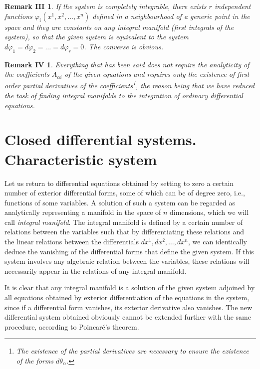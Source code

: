 \begin{rmk40}
\newtheorem*{rmkiii}{\hspace{15pt}Remark III}

\begin{rmkiii}
  If the system is completely integrable, there exists $r$ independent functions $\varphi_{i}(x^{1},x^{2},\dots,x^{n})$ defined in a neighbourhood of a generic point in the space and they are constants on any integral manifold (\emph{first integrals} of the system), so that the given system is equivalent to the system $d\varphi_{1}=d\varphi_{2}=\dots=d\varphi_{r}=0$. The converse is obvious.
\end{rmkiii}
\end{rmk40}

\newtheorem*{rmkiv}{\hspace{15pt}Remark IV}
\begin{rmkiv}
  Everything that has been said does not require the analyticity of the coefficients $A_{\alpha i}$ of the given equations and requires only the existence of first order partial derivatives of the coefficients\footnote{The existence of the partial derivatives are necessary  to ensure the existence of the forms $d\theta_{\alpha}$.}, the reason being that we have reduced the task of finding  integral manifolds to the integration of ordinary differential equations.
\end{rmkiv}

\section{Closed differential systems. Characteristic system}
\label{sec:clos-diff-syst}

\fsec Let us return to differential equations obtained by setting to zero a certain number of exterior differential forms, some of which can be of degree zero, {i.e.,} functions of some variables. A solution of such a system can be regarded as analytically representing  a manifold in the space of $n$ dimensions, which we will call \emph{integral manifold}. The integral manifold is defined by a certain number of relations between the variables such that by differentiating these relations and the linear relations between the differentials $dx^{1},dx^{2},\dots,dx^{n}$, we can identically deduce the  vanishing of the differential forms that define the given system. If this system involves any algebraic relation between the variables, these relations will necessarily appear in the relations of any integral manifold.

It is clear that any integral manifold is a solution of the given system adjoined by all equations obtained by exterior differentiation of the equations in the system, since if a differential form vanishes, its exterior derivative also vanishes. The new differential system obtained  obviously cannot be extended further with the same procedure, according to Poincar\'e's theorem.

